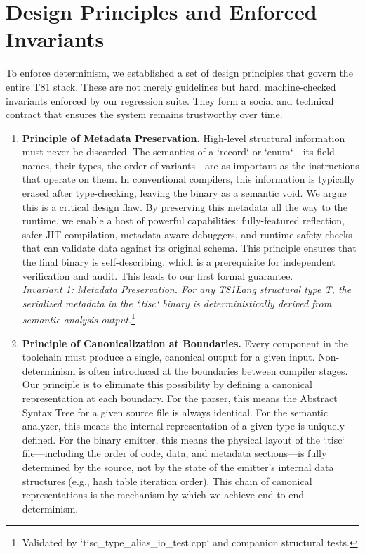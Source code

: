 \documentclass[sigconf, 10pt]{acmart}
\begin{document}
\section{Design Principles and Enforced Invariants}
To enforce determinism, we established a set of design principles that govern the entire T81 stack. These are not merely guidelines but hard, machine-checked invariants enforced by our regression suite. They form a social and technical contract that ensures the system remains trustworthy over time.
\begin{enumerate}
\item \textbf{Principle of Metadata Preservation.} High-level structural information must never be discarded. The semantics of a `record` or `enum`---its field names, their types, the order of variants---are as important as the instructions that operate on them. In conventional compilers, this information is typically erased after type-checking, leaving the binary as a semantic void. We argue this is a critical design flaw. By preserving this metadata all the way to the runtime, we enable a host of powerful capabilities: fully-featured reflection, safer JIT compilation, metadata-aware debuggers, and runtime safety checks that can validate data against its original schema. This principle ensures that the final binary is self-describing, which is a prerequisite for independent verification and audit. This leads to our first formal guarantee. \\
\textit{Invariant 1: Metadata Preservation. For any T81Lang structural type T, the serialized metadata in the `.tisc` binary is deterministically derived from semantic analysis output.}\footnote{Validated by `tisc_type_alias_io_test.cpp` and companion structural tests.}
\item \textbf{Principle of Canonicalization at Boundaries.} Every component in the toolchain must produce a single, canonical output for a given input. Non-determinism is often introduced at the boundaries between compiler stages. Our principle is to eliminate this possibility by defining a canonical representation at each boundary. For the parser, this means the Abstract Syntax Tree for a given source file is always identical. For the semantic analyzer, this means the internal representation of a given type is uniquely defined. For the binary emitter, this means the physical layout of the `.tisc` file---including the order of code, data, and metadata sections---is fully determined by the source, not by the state of the emitter's internal data structures (e.g., hash table iteration order). This chain of canonical representations is the mechanism by which we achieve end-to-end determinism. \\

\end{enumerate}
\end{document}
